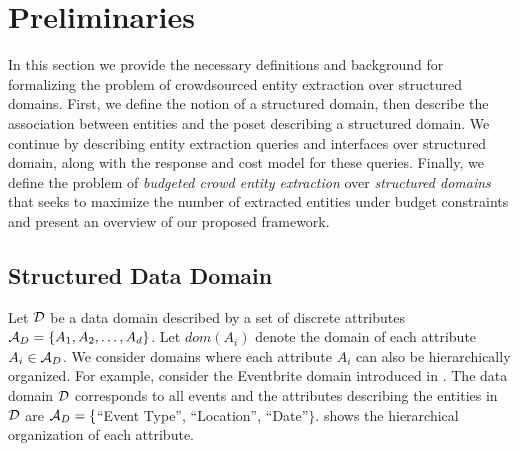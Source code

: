 
\section{Preliminaries}
\label{sec:prelims}
In this section we provide the necessary definitions and background for formalizing the problem of crowdsourced entity extraction over structured domains. First, we define the notion of a structured domain, then describe the association between entities and the poset describing a structured domain. We continue by describing 
entity extraction queries and interfaces over structured domain, along with the response and cost model for these queries. Finally, we define the problem of {\em budgeted crowd entity extraction} over {\em structured domains} that seeks to maximize the number of extracted entities under budget constraints and present an overview of our proposed framework.


\subsection{Structured Data Domain}
\label{sec:data-domain}

Let $\mathcal{D}$ be a data domain described by a set of discrete attributes $\mathcal{A}_D = \{A_1, A_2, \dots, A_d\}$. Let $dom(A_i)$ denote the domain of each attribute $A_i  \in \mathcal{A}_D$. We consider domains where each attribute $A_i$ can also be hierarchically organized. \iftr For example, consider the Eventbrite domain introduced in . The data domain $\mathcal{D}$ corresponds to all events and the attributes describing the entities in $\mathcal{D}$ are $\mathcal{A}_D = \{$``Event Type'', ``Location'', ``Date''$\}$.  shows the hierarchical organization of each attribute.

